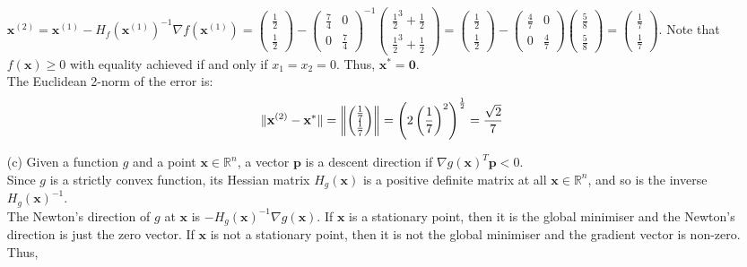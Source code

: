 \documentclass{article}
\DeclarePairedDelimiter{\norm}{\lVert}{\rVert}
\begin{document}
\begin{itemize}
   $\mathbf{x}^{(2)}=\mathbf{x}^{(1)} - H_f(\mathbf{x}^{(1)})^{-1}\nabla f(\mathbf{x}^{(1)}) = \begin{pmatrix}\frac12\\\frac12\end{pmatrix} - \begin{pmatrix} \frac74&0\\0&\frac74\end{pmatrix}^{-1}\begin{pmatrix}\frac12^3+\frac12\\\frac12^3+\frac12\end{pmatrix}= \begin{pmatrix}\frac12\\\frac12\end{pmatrix} - \begin{pmatrix} \frac47&0\\0&\frac47\end{pmatrix}\begin{pmatrix}\frac58\\\frac58\end{pmatrix}=\begin{pmatrix}\frac17\\\frac17\end{pmatrix}$.
   Note that $f(\mathbf{x}) \geq 0$ with equality achieved if and only if $x_1=x_2=0$. Thus, $\mathbf{x}^*=\mathbf{0}$.\\
   The Euclidean 2-norm of the error is:\[ \norm{\mathbf{x}^{(2)} - \mathbf{x}^*} = \left\lVert\begin{pmatrix} \frac17\\ \frac17 \end{pmatrix}\right\rVert = \left(2\left(\frac17\right)^2\right)^\frac12 = \frac{\sqrt2}{7}\]
   \item[(c)] Given a function $g$ and a point $\mathbf{x}\in\mathbb{R}^n$, a vector $\mathbf{p}$ is a descent direction if $\nabla g(\mathbf{x})^T\mathbf{p}<0$.\\
   Since $g$ is a strictly convex function, its Hessian matrix $H_g(\mathbf{x})$ is a positive definite matrix at all $\mathbf{x} \in \mathbb{R}^n$, and so is the inverse $H_g(\mathbf{x})^{-1}$.\\
   The Newton's direction of $g$ at $\mathbf{x}$ is $-H_g(\mathbf{x})^{-1}\nabla g(\mathbf{x})$. If $\mathbf{x}$ is a stationary point, then it is the global minimiser and the Newton's direction is just the zero vector. If $\mathbf{x}$ is not a stationary point, then it is not the global minimiser and the gradient vector is non-zero. Thus,

\end{itemize}
\end{document}
